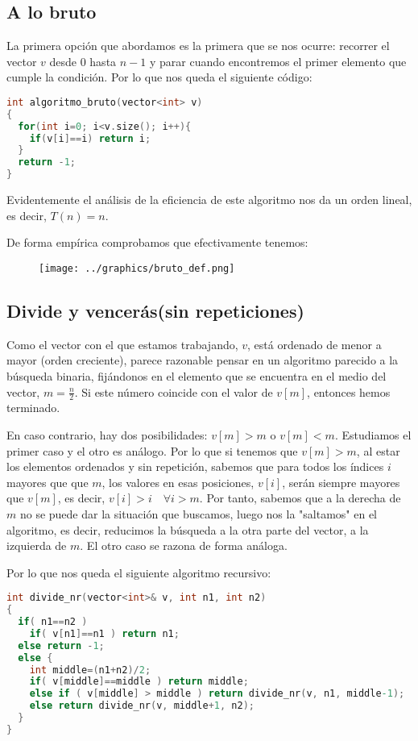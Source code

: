 \documentclass[11pt]{article}
\begin{document}
\subsection{A lo bruto}
La primera opción que abordamos es la primera que se nos ocurre: recorrer el vector $v$ desde $0$ hasta $n-1$ y parar cuando encontremos el primer elemento que cumple la condición.
Por lo que nos queda el siguiente código:

\begin{lstlisting}[language=C]
int algoritmo_bruto(vector<int> v)
{
  for(int i=0; i<v.size(); i++){
    if(v[i]==i) return i;
  }
  return -1;
}
\end{lstlisting}

Evidentemente el análisis de la eficiencia de este algoritmo nos da un orden lineal, es decir, $T(n)=n$.

De forma empírica comprobamos que efectivamente tenemos:

\begin{figure}[h]
\centering
\texttt{[image: ../graphics/bruto\_def.png]}
\end{figure}

\newpage

\subsection{Divide y vencerás(sin repeticiones)}

Como el vector con el que estamos trabajando, $v$, está ordenado de menor a mayor (orden creciente), parece razonable pensar en un algoritmo parecido a la búsqueda binaria, fijándonos en el elemento que se encuentra en el medio del vector, $m=\frac{n}{2}$. Si este número coincide con el valor de $v[m]$, entonces hemos terminado. 

En caso contrario, hay dos posibilidades: $v[m]>m$ o $v[m]<m$. Estudiamos el primer caso y el otro es análogo. Por lo que si tenemos que $v[m]>m$, al estar los elementos ordenados y sin repetición, sabemos que para todos los índices $i$ mayores que que $m$, los valores en esas posiciones, $v[i]$, serán siempre mayores que $v[m]$, es decir, $v[i]>i \quad \forall i > m$. Por tanto, sabemos que a la derecha de $m$ no se puede dar la situación que buscamos, luego nos la "saltamos" en el algoritmo, es decir, reducimos la búsqueda a la otra parte del vector, a la izquierda de $m$. El otro caso se razona de forma análoga.

Por lo que nos queda el siguiente algoritmo recursivo:
\begin{lstlisting}[language=C]
int divide_nr(vector<int>& v, int n1, int n2)
{
  if( n1==n2 )
    if( v[n1]==n1 ) return n1;
  else return -1;
  else {
    int middle=(n1+n2)/2;
    if( v[middle]==middle ) return middle;
    else if ( v[middle] > middle ) return divide_nr(v, n1, middle-1);
    else return divide_nr(v, middle+1, n2);
  }
}
\end{lstlisting}
\end{document}
